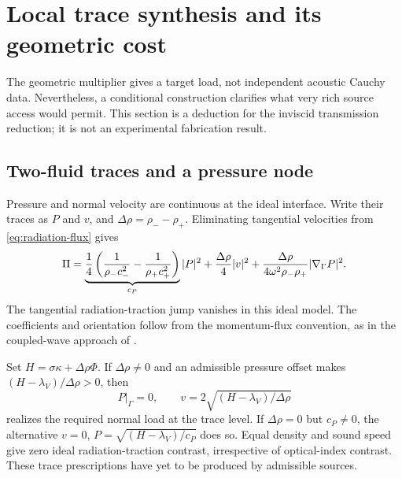 \section{Local trace synthesis and its geometric cost}
\label{sec:constructive}

The geometric multiplier gives a target load, not independent acoustic Cauchy
data. Nevertheless, a conditional construction clarifies what very rich source
access would permit. This section is a deduction for the inviscid transmission
reduction; it is not an experimental fabrication result.

\subsection{Two-fluid traces and a pressure node}
Pressure and normal velocity are continuous at the ideal interface. Write their
traces as $P$ and $v$, and $\Delta\rho=\rho_- -\rho_+$. Eliminating tangential
velocities from \cref{eq:radiation-flux} gives
\begin{equation}
 \Pi=\underbrace{\frac14\left(\frac1{\rho_-c_-^2}
                       -\frac1{\rho_+c_+^2}\right)}_{c_P}|P|^2
       +\frac{\Delta\rho}{4}|v|^2
       +\frac{\Delta\rho}{4\omega^2\rho_-\rho_+}|\nabla_\Gamma P|^2.
 \label{eq:trace-traction-constructive}
\end{equation}
The tangential radiation-traction jump vanishes in this ideal model. The
coefficients and orientation follow from the momentum-flux convention, as in
the coupled-wave approach of \cite{chesneau2022}.

Set $H=\sigma\kappa+\Delta\rho\Phi$. If $\Delta\rho\ne0$ and an admissible
pressure offset makes $(H-\lambda_V)/\Delta\rho>0$, then
\begin{equation}
 P|_\Gamma=0,\qquad v=2\sqrt{(H-\lambda_V)/\Delta\rho}
 \label{eq:pressure-node-traces}
\end{equation}
realizes the required normal load at the trace level. If $\Delta\rho=0$ but
$c_P\ne0$, the alternative $v=0$, $P=\sqrt{(H-\lambda_V)/c_P}$ does so.
Equal density and sound speed give zero ideal radiation-traction contrast,
irrespective of optical-index contrast. These trace prescriptions have yet to
be produced by admissible sources.

